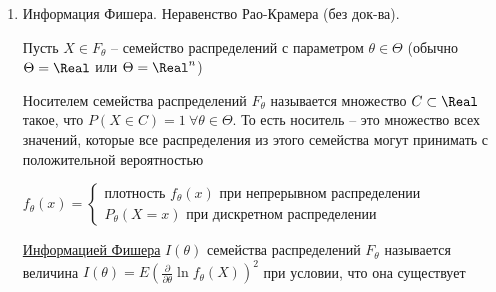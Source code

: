 \begin{enumerate}
    и $L(\vec{X}, \theta) = f_\theta(x_1) \dots f_\theta(x_n) = \prod_{i = 1}^n f_\theta(x_i)$ в абсолютно непрерывном распределении

    \Defs Логарифмической функцией правдоподобия называется функция $\ln L(\vec{X}, \theta)$

    \Notas Так как $y = \ln x$ возрастающая функция, точки максимума совпадают, а такую функцию правдоподобия становится легче дифференцировать

    \Defs Оценкой максимального правдоподобия $\hat{\theta}$ называется значение $\theta$, при котором функция правдоподобия 
    $L(\vec{X}, \theta)$ достигает наибольшего значения (при фиксированных значениях выборки)

    \Ex Пусть $\vec{X} = (X_1, \dots, X_n)$ -- выборка из распределения Пуассона $\Pi_\lambda$ с неизвестным $\lambda > 0$

    Для распределения Пуассона $P(X = x_i) = \frac{\lambda^{x_i}}{x_i!} e^{-\lambda}$. Получаем функцию максимального правдоподобия $L(\vec{X}, \lambda) = \frac{\lambda^{n \overline{x}}}{\prod_{i = 1}^n x_i!} e^{-n\lambda}$. Тогда $\ln L(\vec{X}, \lambda) = n \overline{x} \ln \lambda - \ln \prod_{i = 1}^n x_i! - n\lambda$
    
    $\frac{\partial \ln L}{\partial \lambda} = \frac{n \overline{x}}{\lambda} - n = 0 \Longrightarrow \hat{\lambda} = \overline{x}$ -- оценка максимального правдоподобия
    
    \item Информация Фишера. Неравенство Рао-Крамера (без док-ва).

    Пусть $X \in F_\theta$ -- семейство распределений с параметром $\theta \in \Theta$ (обычно $\Theta = \Real$ или $\Theta = \Real^n$)

    \Def Носителем семейства распределений $F_\theta$ называется множество $C \subset \Real$
    такое, что $P(X \in C) = 1 \ \forall \theta \in \Theta$. То есть носитель -- это множество всех значений, которые все распределения из этого семейства могут принимать с положительной вероятностью

    $f_\theta(x) = \begin{cases}
        \text{плотность } f_\theta(x) \text{ при непрерывном распределении} \\
        P_\theta(X = x) \text{ при дискретном распределении}
    \end{cases}$

    \Def \hyperlink{fishers_information}{Информацией Фишера} $I(\theta)$ семейства распределений $F_\theta$ называется величина 
    $I(\theta) = E\left(\frac{\partial}{\partial \theta} \ln f_\theta(X)\right)^2$ при условии, что
    она существует


\end{enumerate}
